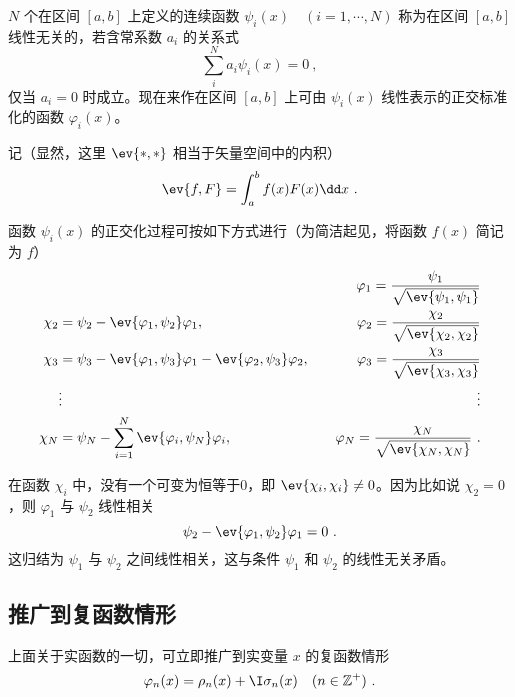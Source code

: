 $N$ 个在区间 $[a,b]$ 上定义的连续函数 $\psi_i(x)\quad (i=1,\cdots ,N)$ 称为在区间 $[a,b]$ 线性无关的，若含常系数 $a_i$ 的关系式
\begin{equation}
\sum_i^N a_i\psi_i(x)=0~,
\end{equation}
仅当 $a_i=0$ 时成立。现在来作在区间 $[a,b]$ 上可由 ${\psi_i(x)}$ 线性表示的正交标准化的函数 ${\varphi_i(x)}$。

记（显然，这里 $\ev{*,*}$ 相当于矢量空间中的内积）
\begin{equation}
\ev{f,F}=\int_a^b f(x)F(x)\dd x~.
\end{equation}

函数 ${\psi_i(x)}$ 的正交化过程可按如下方式进行（为简洁起见，将函数 $f(x)$ 简记为 $f$）
\begin{equation}
\begin{aligned}
&&\varphi_1=\frac{\psi_1}{\sqrt{\ev{\psi_1,\psi_1}}}\\
\chi_2&=\psi_2-\ev{\varphi_1,\psi_2}\varphi_1,\quad&\varphi_2=\frac{\chi_2}{\sqrt{\ev{\chi_2,\chi_2}}}\\
\chi_3&=\psi_3-\ev{\varphi_1,\psi_3}\varphi_1-\ev{\varphi_2,\psi_3}\varphi_2,\quad &\varphi_3=\frac{\chi_3}{\sqrt{\ev{\chi_3,\chi_3}}}\\
&\vdots &\vdots
\\
\chi_N&=\psi_N-\sum_{i=1}^N\ev{\varphi_i,\psi_N}\varphi_i,\quad&\varphi_N=\frac{\chi_N}{\sqrt{\ev{\chi_N,\chi_N}}}~.
\end{aligned}
\end{equation}

在函数 $\chi_i$ 中，没有一个可变为恒等于0，即 $\ev{\chi_i,\chi_i}\neq 0$。因为比如说 $\chi_2=0$，则 $\varphi_1$ 与 $\psi_2$ 线性相关
\begin{equation}
\psi_2-\ev{\varphi_1,\psi_2}\varphi_1=0~.
\end{equation}
这归结为 $\psi_1$ 与 $\psi_2$ 之间线性相关，这与条件 $\psi_1$ 和 $\psi_2$ 的线性无关矛盾。
\subsection{推广到复函数情形}
上面关于实函数的一切，可立即推广到实变量 $x$ 的复函数情形
\begin{equation}
\varphi_n(x)=\rho_n(x)+\I \sigma_n(x)\quad(n\in \mathbb{Z}^+)~.
\end{equation}

